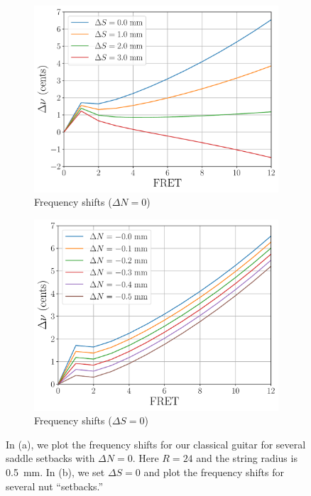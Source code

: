 \begin{figure}
    \centering
    \begin{subfigure}[b]{0.8\textwidth}
        \centering
        \includegraphics[width=5.0in]{../figures/comp_ds}
        \caption{Frequency shifts ($\Delta N = 0$)}
        \label{fig:comp_ds}
    \end{subfigure}
    \par\vspace{0.25in}
    \begin{subfigure}[b]{0.8\textwidth}
        \centering
        \includegraphics[width=5.0in]{../figures/comp_dn}
        \caption{Frequency shifts ($\Delta S = 0$)}
        \label{fig:comp_dn}
    \end{subfigure}
    \caption{\label{fig:comp_dsdn} In (a), we plot the frequency shifts for our classical guitar for several saddle setbacks with $\Delta N = 0$. Here $R = 24$ and the string radius is 0.5~mm. In (b), we set $\Delta S = 0$ and plot the frequency shifts for several nut ``setbacks.''}
  \end{figure}
  
